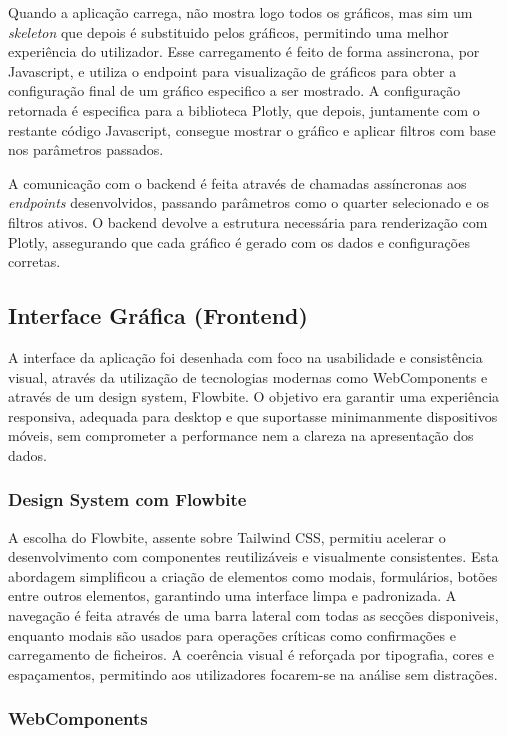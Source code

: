 Quando a aplicação carrega, não mostra logo todos os gráficos, mas sim um \textit{skeleton} que depois é substituido pelos gráficos, permitindo uma melhor experiência do utilizador. Esse carregamento é feito de forma assincrona, por Javascript, e utiliza o endpoint para visualização de gráficos para obter a configuração final de um gráfico especifico a ser mostrado. A configuração retornada é especifica para a biblioteca Plotly, que depois, juntamente com o restante código Javascript, consegue mostrar o gráfico e aplicar filtros com base nos parâmetros passados.

A comunicação com o backend é feita através de chamadas assíncronas aos \textit{endpoints} desenvolvidos, passando parâmetros como o quarter selecionado e os filtros ativos. O backend devolve a estrutura necessária para renderização com Plotly, assegurando que cada gráfico é gerado com os dados e configurações corretas.

\subsection{Interface Gráfica (Frontend)}

A interface da aplicação foi desenhada com foco na usabilidade e consistência visual, através da utilização de tecnologias modernas como WebComponents e através de um design system, Flowbite. O objetivo era garantir uma experiência responsiva, adequada para desktop e que suportasse minimanmente dispositivos móveis, sem comprometer a performance nem a clareza na apresentação dos dados.

\subsubsection{Design System com Flowbite}

A escolha do Flowbite, assente sobre Tailwind CSS, permitiu acelerar o desenvolvimento com componentes reutilizáveis e visualmente consistentes. Esta abordagem simplificou a criação de elementos como modais, formulários, botões entre outros elementos, garantindo uma interface limpa e padronizada. A navegação é feita através de uma barra lateral com todas as secções disponiveis, enquanto modais são usados para operações críticas como confirmações e carregamento de ficheiros. A coerência visual é reforçada por tipografia, cores e espaçamentos, permitindo aos utilizadores focarem-se na análise sem distrações.

\subsubsection{WebComponents}

